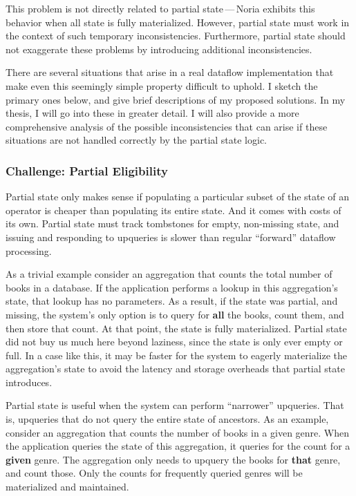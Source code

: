 \documentclass[12pt,letterpaper,twoside]{article}
\begin{document}
This problem is not directly related to partial state\,---\,Noria exhibits this
behavior when all state is fully materialized. However, partial state must work
in the context of such temporary inconsistencies. Furthermore, partial state
should not exaggerate these problems by introducing additional inconsistencies.

There are several situations that arise in a real dataflow implementation that
make even this seemingly simple property difficult to uphold. I sketch the
primary ones below, and give brief descriptions of my proposed solutions. In my
thesis, I will go into these in greater detail. I will also provide a more
comprehensive analysis of the possible inconsistencies that can arise if these
situations are not handled correctly by the partial state logic.

\subsubsection{Challenge: Partial Eligibility}

Partial state only makes sense if populating a particular subset of the
state of an operator is cheaper than populating its entire state. And it
comes with costs of its own. Partial state must track tombstones for
empty, non-missing state, and issuing and responding to upqueries is
slower than regular ``forward'' dataflow processing.

As a trivial example consider an aggregation that counts the total
number of books in a database. If the application performs a lookup in
this aggregation's state, that lookup has no parameters. As a result, if
the state was partial, and missing, the system's only option is to query
for \textbf{all} the books, count them, and then store that count. At that
point, the state is fully materialized. Partial state did not buy us
much here beyond laziness, since the state is only ever empty or full.
In a case like this, it may be faster for the system to eagerly
materialize the aggregation's state to avoid the latency and storage
overheads that partial state introduces.

Partial state is useful when the system can perform ``narrower'' upqueries.
That is, upqueries that do not query the entire state of ancestors. As
an example, consider an aggregation that counts the number of books in a
given genre. When the application queries the state of this aggregation,
it queries for the count for a \textbf{given} genre. The aggregation only
needs to upquery the books for \textbf{that} genre, and count those. Only the
counts for frequently queried genres will be materialized and
maintained.
\end{document}
